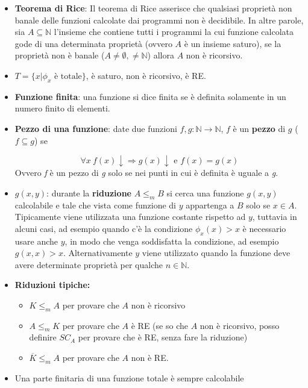 \begin{itemize}
	\item \textbf{Teorema di Rice}: Il teorema di Rice asserisce che qualsiasi proprietà non banale delle funzioni calcolate dai programmi  non è decidibile.
	In altre parole, sia $A \subseteq \mathbb{N}$ l'insieme che contiene tutti i programmi la cui funzione calcolata gode di una determinata proprietà (ovvero $A$ è un insieme saturo), se la proprietà non è banale ($A \neq \emptyset, \neq \mathbb{N}$) allora $A$ non è ricorsivo.
	
	\item $T = \{ x | \phi_x \text{ è totale} \}$, è saturo, non è ricorsivo, è RE.
	
	\item \textbf{Funzione finita}: una funzione si dice finita se è definita solamente in un numero finito di elementi.
	
	\item \textbf{Pezzo di una funzione}: date due funzioni $f,g : \mathbb{N} \rightarrow \mathbb{N}$, $f$ è un \textbf{pezzo} di $g$ ($f \subseteq g$) se
	
	$$
	\forall x \: f(x) \downarrow \Rightarrow g(x) \downarrow \text{ e } f(x) = g(x)
	$$
	Ovvero \textit{f} è un pezzo di \textit{g} solo se nei punti in cui è definita è uguale a \textit{g}.
	
	\item \textbf{$g(x,y)$}: durante la \textbf{riduzione} $A \leq_m B$ si cerca una funzione $g(x,y)$ calcolabile e tale che vista come funzione di $y$ appartenga a $B$ solo se $x \in A$. Tipicamente viene utilizzata una funzione costante rispetto ad $y$, tuttavia in alcuni casi, ad esempio quando c'è la condizione $\phi_x(x) > x$ è necessario usare anche $y$, in modo che venga soddisfatta la condizione, ad esempio $g(x,x) > x$. Alternativamente $y$ viene utilizzato quando la funzione deve avere determinate proprietà per qualche $n \in \mathbb{N}$.
	
	\item \textbf{Riduzioni tipiche:}
	\begin{itemize}
		\item $K \leq_m A$ per provare che $A$ non è ricorsivo
		\item $A \leq_m K$ per provare che $A$ è RE (se so che $A$ non è ricorsivo, posso definire $SC_A$ per provare che è RE, senza fare la riduzione)
		\item $\overline{K} \leq_m A$ per provare che $A$ non è RE.
	\end{itemize}
	
	\item Una parte finitaria di una funzione totale è sempre calcolabile
\end{itemize}

